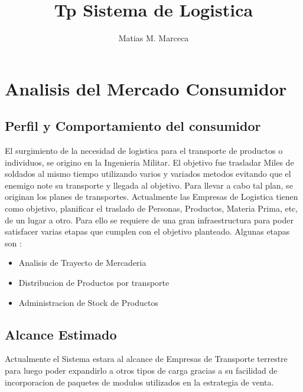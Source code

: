 \documentclass[
10pt, %
a4paper, %
oneside, %
headinclude,footinclude, %
BCOR5mm, %
]{scrartcl}
\title{Tp Sistema de Logistica}
\author{Matias M. Marceca}
\date{}
\begin{document}
\maketitle

\tableofcontents


\section {Analisis del Mercado Consumidor}
\subsection {Perfil y Comportamiento del consumidor}
  El surgimiento de la necesidad de logistica para el transporte de
  productos o individuos, se origino en la Ingenieria Militar.
  El objetivo fue trasladar Miles de soldados al mismo tiempo utilizando
  varios y variados metodos evitando que el enemigo note su transporte
  y llegada al objetivo.
  Para llevar a cabo tal plan, se originan los planes de transportes.
  \newline\newline
  Actualmente las Empresas de Logistica tienen como objetivo, planificar el
  traslado de Personas, Productos, Materia Prima, etc, de un lugar a otro.
  Para ello se requiere de una gran infraestructura para poder satisfacer
  varias etapas que cumplen con el objetivo planteado.
  \newline\newline
  Algunas etapas son :
  \begin{itemize}
    \item  Analisis de Trayecto de Mercaderia
    \item  Distribucion de Productos por transporte
    \item  Administracion de Stock de Productos
  \end{itemize}


\subsection {Alcance Estimado}
  Actualmente el Sistema estara al alcance de Empresas de Transporte terrestre
  para luego poder expandirlo a otros tipos de carga gracias a su facilidad de
  incorporacion de paquetes de modulos utilizados en la estrategia de venta.
\end{document}
